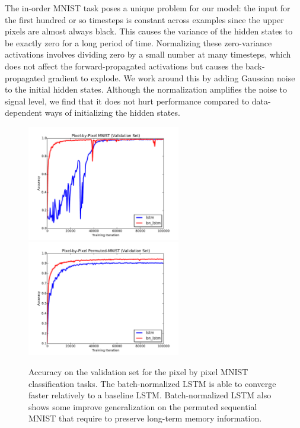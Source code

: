 \documentclass{article} %
\begin{document}
The in-order MNIST task poses a unique problem for our model: the input for the
first hundred or so timesteps is constant across examples since the upper
pixels are almost always black.  This causes the variance of the hidden states
to be exactly zero for a long period of time.  Normalizing these zero-variance
activations involves dividing zero by a small number at many timesteps, which
does not affect the forward-propagated activations but causes the
back-propagated gradient to explode.  We work around this by adding Gaussian
noise to the initial hidden states.  Although the normalization amplifies the
noise to signal level, we find that it does not hurt performance compared to
data-dependent ways of initializing the hidden states.

\begin{figure}[!t]
\center
\includegraphics[width=6.7cm]{figures/unpermuted_valid.pdf}
\includegraphics[width=6.7cm]{figures/permuted_valid.pdf}
\caption{Accuracy on the validation set for the pixel by pixel MNIST
classification tasks. The batch-normalized LSTM is able to converge faster
relatively to a baseline LSTM.  Batch-normalized  LSTM also shows some improve
generalization on the permuted sequential MNIST that require to preserve
long-term memory information.}
\label{fig:seqmnist_valid}
\end{figure}
\end{document}
